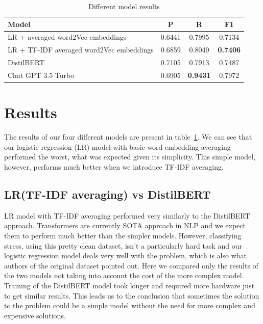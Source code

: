 \documentclass[10pt, a4paper]{article}
\begin{document}
\begin{table}
    \centering
    \caption{Different model results}
    \label{tab:model-results}
    \begin{center}
        \begin{tabular}{|l|c|c|c|}
            \hline
            \textbf{Model} & \textbf{P} & \textbf{R} & \textbf{F1} \\ \hline
            LR + averaged word2Vec embeddings & 0.6441 & 0.7995 & 0.7134 \\ \hline
            LR + TF-IDF averaged word2Vec embeddings & 0.6859 & 0.8049 & \textbf{0.7406} \\ \hline
            DistilBERT & 0.7105 & 0.7913 & 0.7487 \\ \hline
            Chat GPT 3.5 Turbo & 0.6905 & \textbf{0.9431} & 0.7972 \\ \hline
        \end{tabular}
    \end{center}
\end{table}

\section{Results}

The results of our four different models are present in table~\ref{tab:model-results}.
We can see that our logistic regression (LR) model with basic word embedding averaging performed the worst, what was expected given its simplicity.
This simple model, however, performs much better when we introduce TF-IDF averaging.
\subsection{LR(TF-IDF averaging) vs DistilBERT}
LR model with TF-IDF averaging performed very similarly to the DistilBERT approach.
Transformers are currently SOTA approach in NLP and we expect them to perform much better than the simpler models.
However, classifying stress, using this pretty clean dataset, isn't a particularly hard task and our logistic regression model deals very well with the problem, which is also what authors of the original dataset pointed out.
\hfill \break
\hfill \break
Here we compared only the results of the two models not taking into account the cost of the more complex model.
Training of the DistilBERT model took longer and required more hardware just to get similar results.
This leads us to the conclusion that sometimes the solution to the problem could be a simple model without the need for more complex and expensive solutions.
\\
\end{document}
